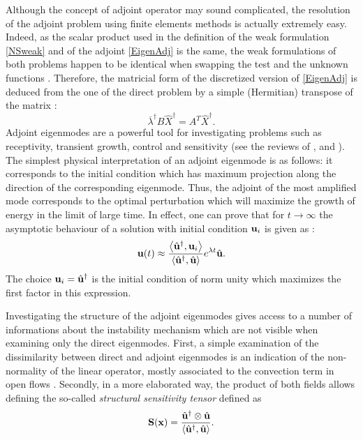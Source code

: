 \documentclass[twocolumn,10pt]{asme2ej}
\newcommand{\be}[1]{ \begin{equation} \label{#1}}
\newcommand{\ee}{\end{equation}}
\begin{document}
Although the concept of adjoint operator may sound complicated, the resolution of the adjoint problem using finite elements methods is actually extremely easy.
Indeed, as the scalar product used in the definition of the weak formulation \eqref{NSweak} and of the adjoint \eqref{EigenAdj} is the same, the weak formulations of both problems happen to be identical when swapping the test and the unknown functions .
Therefore, the matricial form of the discretized version of \eqref{EigenAdj} is deduced from the one of the direct problem by a simple (Hermitian) transpose of the matrix :
\be{Eigen_Adj_matricial}
\overline{\lambda}^\dag B \hat{X}^\dag = A^T \hat{X}^\dag.
\ee
Adjoint eigenmodes are a powerful tool for investigating problems such as receptivity, transient growth, control and sensitivity (see the reviews of \cite{Jmc2005}, \cite{Ps2007} and \cite{LucBott2014}). The simplest physical interpretation of an adjoint eigenmode is as follows: it corresponds to the initial condition which has maximum projection along the direction of the corresponding eigenmode.
Thus, the adjoint of the most amplified mode corresponds to the optimal perturbation which will maximize the growth of energy in the limit of large time. In effect, one can prove that for $t \rightarrow \infty$  the asymptotic behaviour of a solution with initial condition ${\bf u}_i$  is given as :
$$
{\bf u}(t) \approx 
\frac{ \left< \hat{\bf u}^\dag, {\bf u}_i\right>}{\left<\hat{\bf u}^\dag, \hat{\bf u}\right>} 
e^{\lambda t} \hat{\bf u}.
$$
The choice ${\bf u}_i = \hat{\bf u}^\dag$ is the initial condition of norm unity which maximizes the first factor in this expression.

Investigating the structure of the adjoint eigenmodes gives access to a number of informations about the instability mechanism which are not visible when examining only the direct eigenmodes. First, a simple examination of the dissimilarity between direct and adjoint eigenmodes is an indication of the non-normality of the linear operator, mostly associated to the convection term in open flows \cite{Jmc2005}. Secondly, in a more elaborated way, the product of both fields allows defining the so-called {\em structural sensitivity tensor } defined as 
\be{StructurrTens} 
{\bf{S}}({\bf{x}}) = \frac{ \hat{\bf u}^\dag \otimes \hat{\bf u} }{{\left<\hat{\bf u}^\dag, \hat{\bf u}\right>}}.
\ee 
\end{document}
